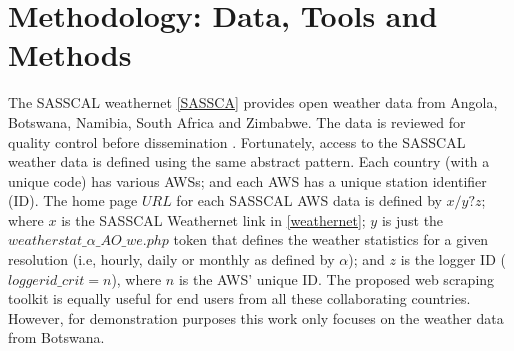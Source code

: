 \documentclass[a4paper, 10pt, conference]{ieeeconf}      %
\begin{document}
  
  \newpage
\section{Methodology: Data, Tools and Methods}
	\label{Metodologia}
	\noindent
	The SASSCAL weathernet \ref{SASSCA} provides open weather  data   from Angola, Botswana, Namibia, South Africa and Zimbabwe. The  data is  reviewed for quality control   before dissemination  \cite{kaspar2015sasscal}. %
Fortunately, access to the   SASSCAL weather data  is defined using the same abstract pattern.
	Each country (with a unique code) has various AWSs; and each AWS has a unique station identifier (ID). 
	The  home page  $URL$ for each SASSCAL AWS data is	defined by $x/y?z$; where
%
$x$ is the SASSCAL Weathernet link in \ref{weathernet};
$y$ is just the $weatherstat\_\alpha\_AO\_we.php$ token that defines the weather statistics for a given  resolution  (i.e, hourly, daily or monthly as defined by $\alpha$); and $z$ is the logger ID ($loggerid\_crit=n$), where $n$ is the AWS' unique  ID.  
	The proposed web scraping toolkit is equally useful for end users from all these collaborating countries. However, for demonstration purposes this work only focuses on  the  weather data from Botswana. %
	\noindent
\end{document}
